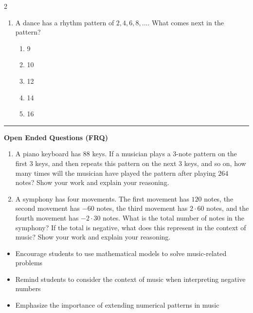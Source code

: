 \documentclass[10pt]{article}
\begin{document}
\begin{multicols}{2}
\begin{enumerate}[label=\textbf{Q\arabic*.}, leftmargin=*, itemsep=6pt, parsep=0pt]
  \item \small A dance has a rhythm pattern of $2, 4, 6, 8, ...$. What comes next in the pattern?
  \begin{enumerate}[label=(\Alph*), leftmargin=0.6cm, nosep, itemsep=2pt]
    \item 9
    \item 10
    \item 12
    \item 14
    \item 16
  \end{enumerate}

\end{enumerate}
\end{multicols}

\vspace{-0.2cm}
\hrule
\vspace{0.2cm}
\textbf{\small Open Ended Questions (FRQ)}
\begin{enumerate}[label=\textbf{Q\arabic*.}, start=9, itemsep=5pt, topsep=0pt]

  \item \small A piano keyboard has $88$ keys. If a musician plays a $3$-note pattern on the first $3$ keys, and then repeats this pattern on the next $3$ keys, and so on, how many times will the musician have played the pattern after playing $264$ notes? Show your work and explain your reasoning. \vspace{2cm}

  \item \small A symphony has four movements. The first movement has $120$ notes, the second movement has $-60$ notes, the third movement has $2 \cdot 60$ notes, and the fourth movement has $-2 \cdot 30$ notes. What is the total number of notes in the symphony? If the total is negative, what does this represent in the context of music? Show your work and explain your reasoning. \vspace{2cm}

\end{enumerate}

\vfill

\begin{tcolorbox}[colback=blue!5, colframe=mainblue!50, title=\small \textbf{Chef's Tips}, fonttitle=\bfseries, bottom=1mm]
\begin{itemize}[noitemsep, topsep=2pt, leftmargin=0.5cm]
  \item \scriptsize Encourage students to use mathematical models to solve music-related problems\item \scriptsize Remind students to consider the context of music when interpreting negative numbers\item \scriptsize Emphasize the importance of extending numerical patterns in music
\end{itemize}
\end{tcolorbox}
\end{document}
